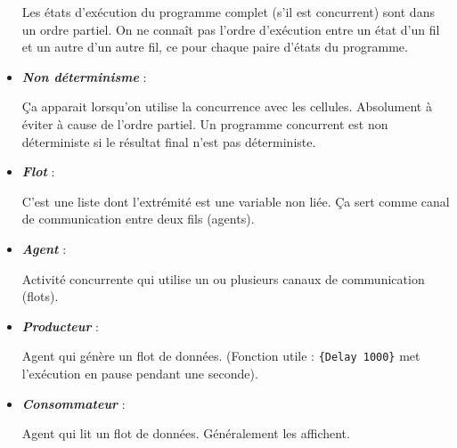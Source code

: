 \begin{itemize}
    Les états d'exécution du programme complet (s'il est concurrent) sont dans un ordre partiel. On ne connaît pas l'ordre d'exécution entre un état d'un fil et un autre d'un autre fil, ce pour chaque paire d'états du programme.

  \item \textbf{\textit{Non déterminisme}} :

    Ça apparait lorsqu'on utilise la concurrence avec les cellules. Absolument à éviter à cause de l'ordre partiel. Un programme concurrent est non déterministe si le résultat final n'est pas déterministe.

  \item \textbf{\textit{Flot}} :

    C'est une liste dont l'extrémité est une variable non liée. Ça sert comme canal de communication entre deux fils (agents).

  \item \textbf{\textit{Agent}} :

    Activité concurrente qui utilise un ou plusieurs canaux de communication (flots).

  \item \textbf{\textit{Producteur}} : 

    Agent qui génère un flot de données. (Fonction utile : \verb${Delay 1000}$ met l'exécution en pause pendant une seconde).

  \item \textbf{\textit{Consommateur}} : 

    Agent qui lit un flot de données. Généralement les affichent.

\end{itemize}


